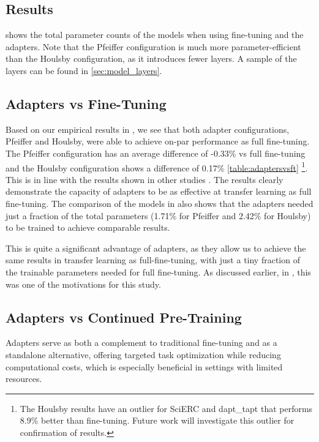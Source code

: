 \documentclass[10pt,twocolumn,letterpaper]{article}
\begin{document}
\subsection{Results}


 shows the total parameter counts of the models when using fine-tuning and the adapters. Note that the Pfeiffer configuration is much more parameter-efficient than the Houlsby configuration, as it introduces fewer layers. A sample of the layers can be found in \ref{sec:model_layers}.



\subsection{Adapters vs Fine-Tuning} 

Based on our empirical results in , we see that both adapter configurations, Pfeiffer and Houlsby, were able to achieve on-par performance as full fine-tuning. The Pfeiffer configuration has an average difference of -0.33\% vs full fine-tuning and the Houlsby configuration shows a difference of 0.17\% \ref{table:adaptersvsft} \footnote{The Houlsby results have an outlier for SciERC and dapt\_tapt that performs 8.9\% better than fine-tuning. Future work will investigate this outlier for confirmation of results.}. This is in line with the results shown in other studies \cite{houlsby2019parameter}. The results clearly demonstrate the capacity of adapters to be as effective at transfer learning as full fine-tuning. The comparison of the models in  also shows that the adapters needed just a fraction of the total parameters (1.71\% for Pfeiffer and 2.42\% for Houlsby) to be trained to achieve comparable results. 

This is quite a significant advantage of adapters, as they allow us to achieve the same results in transfer learning as full-fine-tuning, with just a tiny fraction of the trainable parameters needed for full fine-tuning. As discussed earlier, in , this was one of the motivations for this study.

\subsection{Adapters vs Continued Pre-Training} 

Adapters serve as both a complement to traditional fine-tuning and as a standalone alternative, offering targeted task optimization while reducing computational costs, which is especially beneficial in settings with limited resources.
\end{document}
